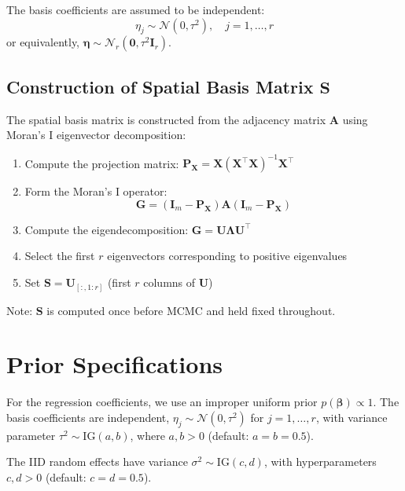 \documentclass[12pt]{article}
\begin{document}
The basis coefficients are assumed to be independent:
\begin{equation}
\eta_j \sim \mathcal{N}(0, \tau^2), \quad j = 1, \ldots, r
\end{equation}
or equivalently, $\boldsymbol{\eta} \sim \mathcal{N}_r(\mathbf{0}, \tau^2 \mathbf{I}_r)$.


\subsection{Construction of Spatial Basis Matrix $\mathbf{S}$}
The spatial basis matrix is constructed from the adjacency matrix $\mathbf{A}$ using Moran's I eigenvector decomposition:

\begin{enumerate}
    \item Compute the projection matrix: $\mathbf{P}_{\mathbf{X}} = \mathbf{X}(\mathbf{X}^\top\mathbf{X})^{-1}\mathbf{X}^\top$
    \item Form the Moran's I operator:
    \begin{equation}
    \mathbf{G} = (\mathbf{I}_m - \mathbf{P}_{\mathbf{X}}) \mathbf{A} (\mathbf{I}_m - \mathbf{P}_{\mathbf{X}})
    \end{equation}
    \item Compute the eigendecomposition: $\mathbf{G} = \mathbf{U} \boldsymbol{\Lambda} \mathbf{U}^\top$
    \item Select the first $r$ eigenvectors corresponding to positive eigenvalues
    \item Set $\mathbf{S} = \mathbf{U}_{[:, 1:r]}$ (first $r$ columns of $\mathbf{U}$)
\end{enumerate}

Note: $\mathbf{S}$ is computed once before MCMC and held fixed throughout.

\section{Prior Specifications}

For the regression coefficients, we use an improper uniform prior
\(p(\boldsymbol{\beta}) \propto 1\).
The basis coefficients are independent,
\(\eta_j \sim \mathcal{N}(0,\tau^2)\) for \(j = 1,\ldots,r\),
with variance parameter \(\tau^2 \sim \text{IG}(a,b)\),
where \(a,b > 0\) (default: \(a = b = 0.5\)).

The IID random effects have variance \(\sigma^2 \sim \text{IG}(c,d)\),
with hyperparameters \(c,d > 0\) (default: \(c = d = 0.5\)).
\end{document}
